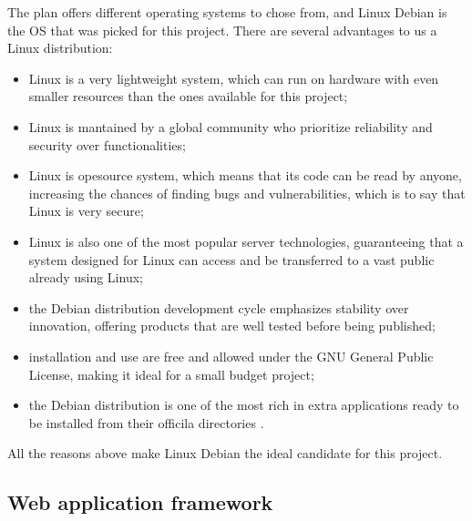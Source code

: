 The plan offers different operating systems to chose from, and Linux Debian is
the OS that was picked for this project. There are several advantages to us a
Linux distribution:
\begin{itemize}
  \item Linux is a very lightweight system, which can run on hardware with even
  smaller resources than the ones available for this project;
  \item Linux is mantained by a global community who prioritize reliability and
  security over functionalities;
  \item Linux is opesource system, which means that its code can be read by
  anyone, increasing the chances of finding bugs and vulnerabilities, which is
  to say that Linux is very secure;
  \item Linux is also one of the most popular server technologies, guaranteeing
  that a system designed for Linux can access and be transferred to a vast
  public already using Linux;
  \item the Debian distribution development cycle emphasizes stability over
  innovation, offering products that are well tested before being published;
  \item installation and use are free and allowed under the GNU General Public
  License, making it ideal for a small budget project;
  \item the Debian distribution is one of the most rich in extra applications
  ready to be installed from their officila directories \cite{Debian}.
\end{itemize}

All the reasons above make Linux Debian the ideal candidate for this project.

\subsection{Web application framework}

